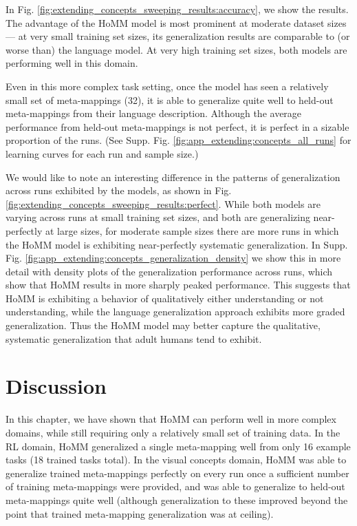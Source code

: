 In Fig. \ref{fig:extending_concepts_sweeping_results:accuracy}, we show the results. The advantage of the HoMM model is most prominent at moderate dataset sizes --- at very small training set sizes, its generalization results are comparable to (or worse than) the language model. At very high training set sizes, both models are performing well in this domain. \par

Even in this more complex task setting, once the model has seen a relatively small set of meta-mappings (32), it is able to generalize quite well to held-out meta-mappings from their language description. Although the average performance from held-out meta-mappings is not perfect, it is perfect in a sizable proportion of the runs. (See Supp. Fig. \ref{fig:app_extending:concepts_all_runs} for learning curves for each run and sample size.) \par

We would like to note an interesting difference in the patterns of generalization across runs exhibited by the models, as shown in Fig. \ref{fig:extending_concepts_sweeping_results:perfect}. While both models are varying across runs at small training set sizes, and both are generalizing near-perfectly at large sizes, for moderate sample sizes there are more runs in which the HoMM model is exhibiting near-perfectly systematic generalization. In Supp. Fig. \ref{fig:app_extending:concepts_generalization_density} we show this in more detail with density plots of the generalization performance across runs, which show that HoMM results in more sharply peaked performance. This suggests that HoMM is exhibiting a behavior of qualitatively either understanding or not understanding, while the language generalization approach exhibits more graded generalization. Thus the HoMM model may better capture the qualitative, systematic generalization that adult humans tend to exhibit.


\section{Discussion}

In this chapter, we have shown that HoMM can perform well in more complex domains, while still requiring only a relatively small set of training data. In the RL domain, HoMM generalized a single meta-mapping well from only 16 example tasks (18 trained tasks total). In the visual concepts domain, HoMM was able to generalize trained meta-mappings perfectly on every run once a sufficient number of training meta-mappings were provided, and was able to generalize to held-out meta-mappings quite well (although generalization to these improved beyond the point that trained meta-mapping generalization was at ceiling). \par 

